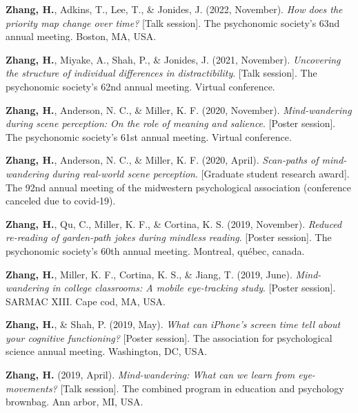 \documentclass[11pt,a4paper,]{awesome-cv}
\begin{document}
\leavevmode{}%
\textbf{Zhang, H.}, Adkins, T., Lee, T., \& Jonides, J. (2022,
November). \emph{How does the priority map change over time?} {[}Talk
session{]}. The psychonomic society's 63nd annual meeting. Boston, MA,
USA.

\leavevmode{}%
\textbf{Zhang, H.}, Miyake, A., Shah, P., \& Jonides, J. (2021,
November). \emph{Uncovering the structure of individual differences in
distractibility}. {[}Talk session{]}. The psychonomic society's 62nd
annual meeting. Virtual conference.

\leavevmode{}%
\textbf{Zhang, H.}, Anderson, N. C., \& Miller, K. F. (2020, November).
\emph{Mind-wandering during scene perception: On the role of meaning and
salience}. {[}Poster session{]}. The psychonomic society's 61st annual
meeting. Virtual conference.

\leavevmode{}%
\textbf{Zhang, H.}, Anderson, N. C., \& Miller, K. F. (2020, April).
\emph{Scan-paths of mind-wandering during real-world scene perception}.
{[}Graduate student research award{]}. The 92nd annual meeting of the
midwestern psychological association (conference canceled due to
covid-19).

\leavevmode{}%
\textbf{Zhang, H.}, Qu, C., Miller, K. F., \& Cortina, K. S. (2019,
November). \emph{Reduced re-reading of garden-path jokes during mindless
reading}. {[}Poster session{]}. The psychonomic society's 60th annual
meeting. Montreal, québec, canada.

\leavevmode{}%
\textbf{Zhang, H.}, Miller, K. F., Cortina, K. S., \& Jiang, T. (2019,
June). \emph{Mind-wandering in college classrooms: A mobile eye-tracking
study}. {[}Poster session{]}. SARMAC XIII. Cape cod, MA, USA.

\leavevmode{}%
\textbf{Zhang, H.}, \& Shah, P. (2019, May). \emph{What can iPhone's
screen time tell about your cognitive functioning?} {[}Poster
session{]}. The association for psychological science annual meeting.
Washington, DC, USA.

\leavevmode{}%
\textbf{Zhang, H.} (2019, April). \emph{Mind-wandering: What can we
learn from eye-movements?} {[}Talk session{]}. The combined program in
education and psychology brownbag. Ann arbor, MI, USA.
\end{document}
